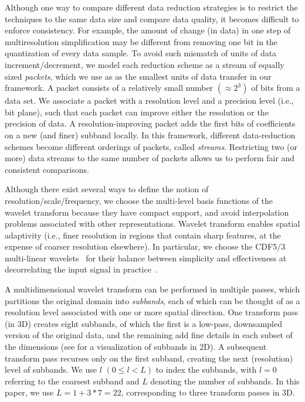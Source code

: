 Although one way to compare different data reduction strategies is to restrict the techniques to the
same data size and compare data quality, it becomes difficult to enforce consistency. For example,
the amount of change (in data) in one step of multiresolution simplification may be different from
removing one bit in the quantization of every data sample. To avoid such mismatch of units of data
increment/decrement, we model each reduction scheme as a stream of equally sized \emph{packets},
which we use as as the smallest units of data transfer in our framework. A packet consists of a
relatively small number $\left(\approx 2^3\right)$ of bits from a data set. We associate a packet
with a resolution level and a precision level (i.e., bit plane), such that each packet can improve
either the resolution or the precision of data. A resolution-improving packet adds the first bits of
coefficients on a new (and finer) subband locally. In this framework, different data-reduction
schemes become different orderings of packets, called \emph{streams}. Restricting two (or more) data
streams to the same number of packets allows us to perform fair and consistent comparisons.

Although there exist several ways to define the notion of resolution/scale/frequency, we choose the
multi-level basis functions of the wavelet transform because they have compact support, and avoid
interpolation problems associated with other representations. Wavelet transform enables spatial
adaptivity (i.e., finer resolution in regions that contain sharp features, at the expense of coarser
resolution elsewhere). In particular, we choose the CDF5/3 multi-linear wavelets~\cite{cdf-wavelets}
for their balance between simplicity and effectiveness at decorrelating the input signal in
practice~\cite{jpeg2000}.

A multidimensional wavelet transform can be performed in multiple passes, which partitions the
original domain into \emph{subbands}, each of which can be thought of as a resolution level
associated with one or more spatial direction. One transform pass (in 3D) creates eight subbands, of
which the first is a low-pass, downsampled version of the original data, and the remaining add fine
details in each subset of the dimensions (see  for a visualization of subbands in
2D). A subsequent transform pass recurses only on the first subband, creating the next (resolution)
level of subbands. We use $l$ $(0 \leq l < L)$ to index the subbands, with $l = 0$ referring to the
coarsest subband and $L$ denoting the number of subbands. In this paper, we use $L=1 + 3*7=22$,
corresponding to three transform passes in 3D.

